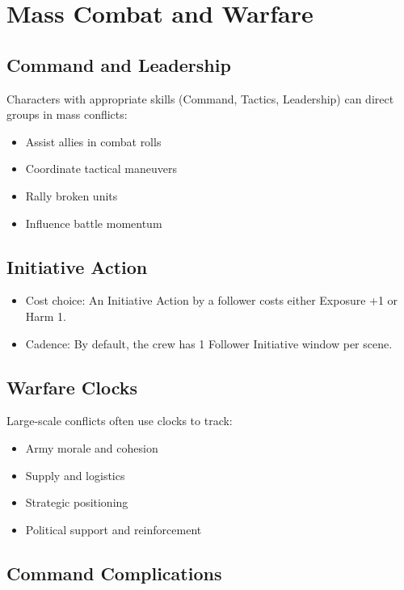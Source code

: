 \section{Mass Combat and Warfare}

\subsection{Command and Leadership}

Characters with appropriate skills (Command, Tactics, Leadership) can direct groups in mass conflicts:

\begin{itemize}
\item Assist allies in combat rolls
\item Coordinate tactical maneuvers
\item Rally broken units
\item Influence battle momentum
\end{itemize}

\subsection{Initiative Action}
\begin{itemize}
    \item Cost choice: An Initiative Action by a follower costs either Exposure +1 or Harm 1.
    \item Cadence: By default, the crew has 1 Follower Initiative window per scene.
\end{itemize}

\subsection{Warfare Clocks}

Large-scale conflicts often use clocks to track:
\begin{itemize}
\item Army morale and cohesion
\item Supply and logistics
\item Strategic positioning
\item Political support and reinforcement
\end{itemize}

\subsection{Command Complications}

